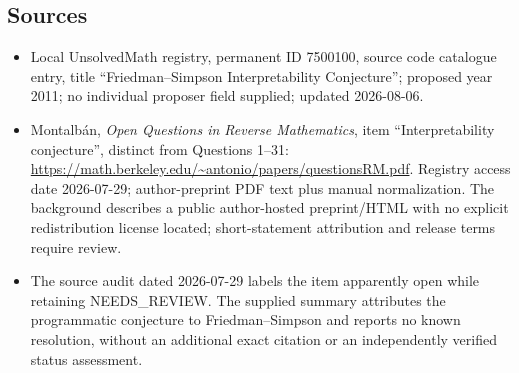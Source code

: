 \documentclass[11pt]{article}
\begin{document}
\subsection{Sources}
\begin{itemize}
\item Local UnsolvedMath registry, permanent ID 7500100, source code catalogue entry, title ``Friedman--Simpson Interpretability Conjecture''; proposed year 2011; no individual proposer field supplied; updated 2026-08-06.
\item Montalb\'an, \emph{Open Questions in Reverse Mathematics}, item ``Interpretability conjecture'', distinct from Questions 1--31: \url{https://math.berkeley.edu/~antonio/papers/questionsRM.pdf}. Registry access date 2026-07-29; author-preprint PDF text plus manual normalization. The background describes a public author-hosted preprint/HTML with no explicit redistribution license located; short-statement attribution and release terms require review.
\item The source audit dated 2026-07-29 labels the item apparently open while retaining NEEDS\_REVIEW. The supplied summary attributes the programmatic conjecture to Friedman--Simpson and reports no known resolution, without an additional exact citation or an independently verified status assessment.
\end{itemize}
\end{document}

